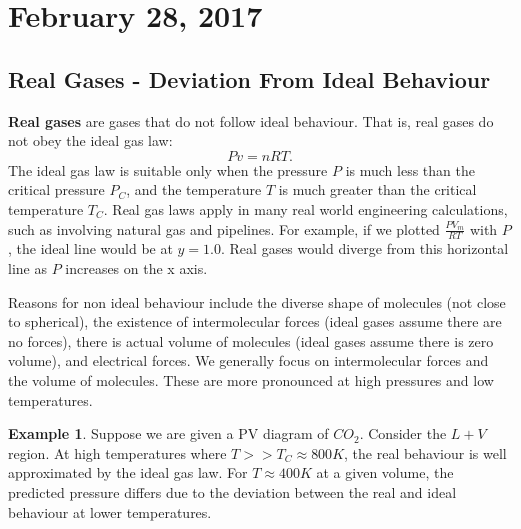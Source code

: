 \documentclass[11pt]{article}
\theoremstyle{plain} %
\theoremstyle{definition}
\theoremstyle{example}
\newtheorem*{example}{Example}
\theoremstyle{remark}
\begin{document}
	
	
	
	
	
	
	
	
	
	
	
	
	
	
	
	
	
	
	
	
	
	
	
	
	
	
	
	
	
	
	
	
	
	
	
\section{February 28, 2017}
\subsection{Real Gases - Deviation From Ideal Behaviour}

\textbf{Real gases} are gases that do not follow ideal behaviour. That is, real gases do not obey the ideal gas law:$$Pv = nRT.$$
The ideal gas law is suitable only when the pressure $P$ is much less than the critical pressure $P_C$, and the temperature $T$ is much greater than the critical temperature $T_C$. Real gas laws apply in many real world engineering calculations, such as involving natural gas and pipelines. For example, if we plotted $\frac{PV_m}{RT}$ with $P$, the ideal line would be at $y=1.0$. Real gases would diverge from this horizontal line as $P$ increases on the x axis. 

Reasons for non ideal behaviour include the diverse shape of molecules (not close to spherical), the existence of intermolecular forces (ideal gases assume there are no forces), there is actual volume of molecules (ideal gases assume there is zero volume), and electrical forces. We generally focus on intermolecular forces and the volume of molecules. These are more pronounced at high pressures and low temperatures. 
	
\begin{example}
Suppose we are given a PV diagram of $CO_2$. Consider the $L+V$ region. At high temperatures where $T >> T_C \approx 800K$, the real behaviour is well approximated by the ideal gas law. For $T \approx 400K$ at a given volume, the predicted pressure differs due to the deviation between the real and ideal behaviour at lower temperatures.
\end{example}
	
\end{document}
